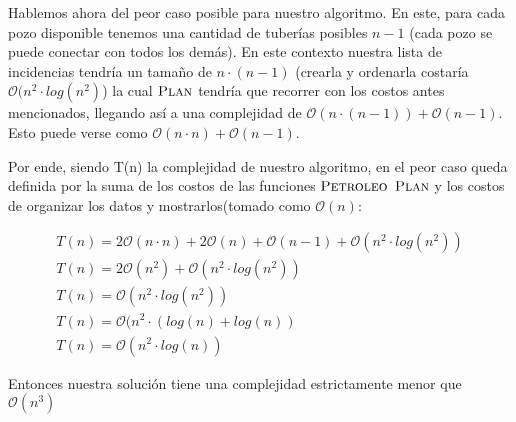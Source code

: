 Hablemos ahora del peor caso posible para nuestro algoritmo. En este, para cada pozo disponible tenemos una cantidad de tuberías posibles $n-1$ (cada pozo se puede conectar con todos los demás). En este contexto nuestra lista de incidencias tendría un tamaño de $n \cdot (n-1)$ (crearla y ordenarla costaría $\mathcal{O}(n^2 \cdot log(n^2)$) la cual $\textnormal{\scshape Plan}$ tendría que recorrer con los costos antes mencionados, llegando así a una complejidad de $\mathcal{O}(n \cdot (n-1)) + \mathcal{O}(n-1)$. Esto puede verse como $\mathcal{O}(n \cdot n) + \mathcal{O}(n-1)$.

Por ende, siendo T(n) la complejidad de nuestro algoritmo, en el peor caso queda definida por la suma de los costos de las funciones $\textnormal{\scshape Petroleo}$ $\textnormal{\scshape Plan}$ y los costos de organizar los datos y mostrarlos(tomado como $\mathcal{O}(n)$:

\begin{equation*}
\begin{array}{l}
T(n) = 2\mathcal{O}(n \cdot n) + 2\mathcal{O}(n) + \mathcal{O}(n-1) + \mathcal{O}(n^2 \cdot log(n^2))\\
T(n) = 2\mathcal{O}(n^2) + \mathcal{O}(n^2 \cdot log(n^2))\\
T(n) = \mathcal{O}(n^2 \cdot log(n^2))\\
T(n) = \mathcal{O}(n^2 \cdot (log(n) + log(n))\\
T(n) = \mathcal{O}(n^2 \cdot log(n))
\end{array}
\end{equation*}

Entonces nuestra solución tiene una complejidad estrictamente menor que $\mathcal{O}(n^3)$

